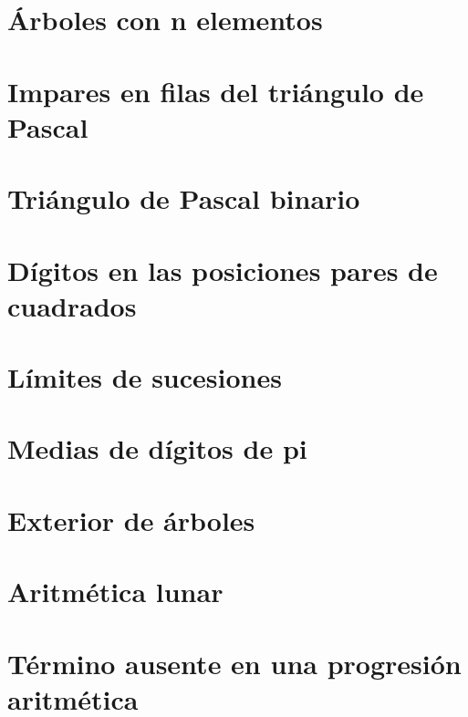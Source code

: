 \documentclass[a4paper,12pt,twoside]{book}
\begin{document}
\chapter{Árboles con n elementos}
\label{190129}

\chapter{Impares en filas del triángulo de Pascal}
\label{190130}

\chapter{Triángulo de Pascal binario}
\label{190131}

\chapter{Dígitos en las posiciones pares de cuadrados}
\label{190201}


\chapter{Límites de sucesiones}
\label{190204}

\chapter{Medias de dígitos de pi}
\label{190205}

\chapter{Exterior de árboles}
\label{190206}

\chapter{Aritmética lunar}
\label{190207}

\chapter{Término ausente en una progresión aritmética}
\label{190208}
\end{document}
